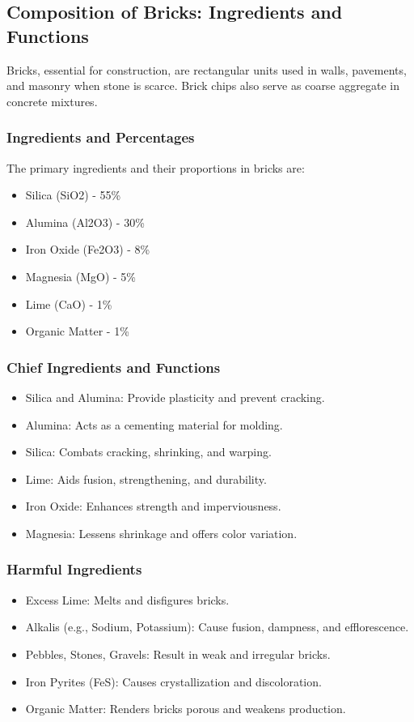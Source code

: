 \subsection{Composition of Bricks: Ingredients and Functions}
Bricks, essential for construction, are rectangular units used in walls, pavements, and masonry when stone is scarce. Brick chips also serve as coarse aggregate in concrete mixtures.

\subsubsection{Ingredients and Percentages}
The primary ingredients and their proportions in bricks are:
\begin{itemize}
  \item Silica (SiO2) - 55\%
  \item Alumina (Al2O3) - 30\%
  \item Iron Oxide (Fe2O3) - 8\%
  \item Magnesia (MgO) - 5\%
  \item Lime (CaO) - 1\%
  \item Organic Matter - 1\%
\end{itemize}

\subsubsection{Chief Ingredients and Functions}
\begin{itemize}
  \item Silica and Alumina: Provide plasticity and prevent cracking.
  \item Alumina: Acts as a cementing material for molding.
  \item Silica: Combats cracking, shrinking, and warping.
  \item Lime: Aids fusion, strengthening, and durability.
  \item Iron Oxide: Enhances strength and imperviousness.
  \item Magnesia: Lessens shrinkage and offers color variation.
\end{itemize}

\subsubsection{Harmful Ingredients}
\begin{itemize}
  \item Excess Lime: Melts and disfigures bricks.
  \item Alkalis (e.g., Sodium, Potassium): Cause fusion, dampness, and efflorescence.
  \item Pebbles, Stones, Gravels: Result in weak and irregular bricks.
  \item Iron Pyrites (FeS): Causes crystallization and discoloration.
  \item Organic Matter: Renders bricks porous and weakens production.
\end{itemize}